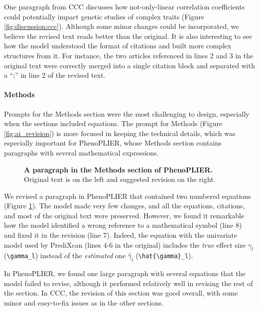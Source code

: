 \documentclass[
]{article}
\begin{document}
One paragraph from CCC discusses how not-only-linear correlation coefficients could potentially impact genetic studies of complex traits (Figure \ref{fig:discussion:ccc}).
Although some minor changes could be incorporated, we believe the revised text reads better than the original.
It is also interesting to see how the model understood the format of citations and built more complex structures from it.
For instance, the two articles referenced in lines 2 and 3 in the original text were correctly merged into a single citation block and separated with a ``;'' in line 2 of the revised text.

\hypertarget{methods}{%
\paragraph{Methods}\label{methods}}

Prompts for the Methods section were the most challenging to design, especially when the sections included equations.
The prompt for Methods (Figure \ref{fig:ai_revision}) is more focused in keeping the technical details, which was especially important for PhenoPLIER, whose Methods section contains paragraphs with several mathematical expressions.

\begin{figure}
\hypertarget{fig:methods:phenoplier}{%
\centering

\caption{\textbf{A paragraph in the Methods section of PhenoPLIER.}
Original text is on the left and suggested revision on the right.}\label{fig:methods:phenoplier}
}
\end{figure}

We revised a paragraph in PhenoPLIER that contained two numbered equations (Figure \ref{fig:methods:phenoplier}).
The model made very few changes, and all the equations, citations, and most of the original text were preserved.
However, we found it remarkable how the model identified a wrong reference to a mathematical symbol (line 8) and fixed it in the revision (line 7).
Indeed, the equation with the univariate model used by PrediXcan (lines 4-6 in the original) includes the \emph{true} effect size \(\gamma_l\) (\texttt{\textbackslash{}gamma\_l}) instead of the \emph{estimated} one \(\hat{\gamma}_l\) (\texttt{\textbackslash{}hat\{\textbackslash{}gamma\}\_l}).

In PhenoPLIER, we found one large paragraph with several equations that the model failed to revise, although it performed relatively well in revising the rest of the section.
In CCC, the revision of this section was good overall, with some minor and easy-to-fix issues as in the other sections.
\end{document}
